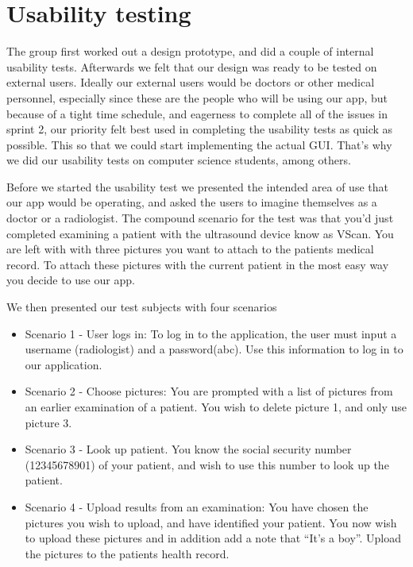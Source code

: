 \section{Usability testing}
\label{usability}

The group first worked out a design prototype, and did a couple of internal usability tests. Afterwards we felt that our design was ready to be tested on external users. Ideally our external users would be doctors or other medical personnel, especially since these are the people who will be using our app, but because of a tight time schedule, and eagerness to complete all of the issues in sprint 2, our priority felt best used in completing the usability tests as quick as possible. This so that we could start  implementing the actual GUI. That’s why we did our usability tests on computer science students, among others.

Before we started the usability test we presented the intended area of use that our app would be operating, and asked the users to imagine themselves as a doctor or a radiologist. The compound scenario for the test was that you’d just completed examining a patient with the ultrasound device know as VScan. You are left with with three pictures you want to attach to the patients medical record. To attach these pictures with the current patient in the most easy way you decide to use our app.

We then presented our test subjects with four scenarios
\begin{itemize}
    \item Scenario 1 - User logs in: To log in to the application, the user must input a username (radiologist) and a password(abc).         Use this information to log in to our application.

    \item Scenario 2 - Choose pictures: You are prompted with a list of pictures from an earlier examination of a patient. You wish         to delete picture 1, and only use picture 3. 
    
    \item Scenario 3 - Look up patient. You know the social security number\\(12345678901) of your patient, and wish to use this number to look up the patient. 
    
	\item Scenario 4 - Upload results from an examination: You have chosen the pictures you wish to upload, and have identified your patient. You now wish to upload these pictures and in addition add a note that “It’s a boy”. Upload the pictures to the patients health record. 
\end{itemize}

